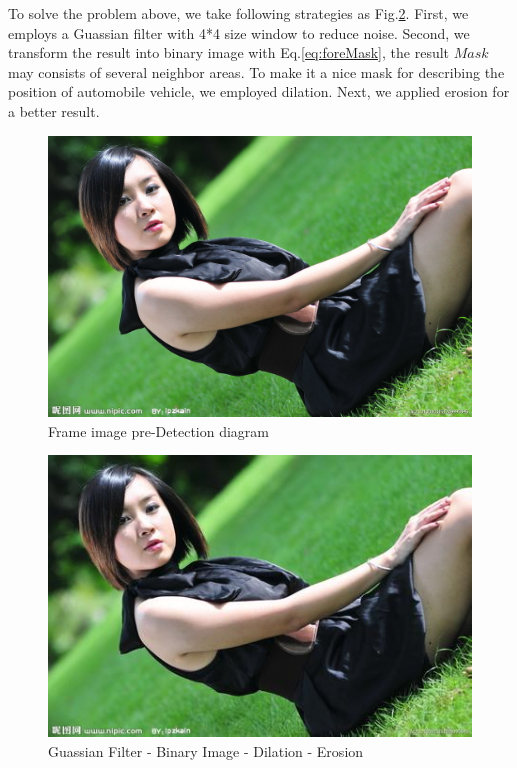 \documentclass[conference]{IEEEtran}
\begin{document}
	To solve the problem above, we take following strategies as Fig.\ref{fig:preDetection}. First, we employs a Guassian filter with 4*4 size window to reduce noise. Second, we transform the result into binary image with Eq.\ref{eq:foreMask}, the result $Mask$ may consists of several neighbor areas. To make it a nice mask for describing the position of automobile vehicle, we employed dilation. Next, we applied erosion for a better result.
	\begin{figure}[!h]
	\centering
	\includegraphics[width=1\linewidth]{figures/lena.jpg} 
	\caption{Frame image pre-Detection diagram}
	\label{fig:preDetection}
	\end{figure}
	
	\begin{figure}[!h]
	\centering
	\includegraphics[width=1\linewidth]{figures/jena.jpg} 
	\caption{Guassian Filter - Binary Image - Dilation - Erosion}
	\label{fig:preDetection}
	\end{figure}
	
\end{document}
